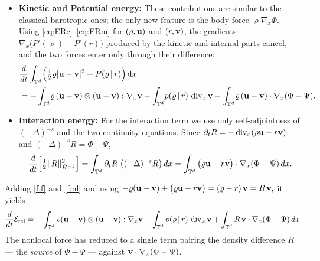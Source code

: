 \documentclass[12pt,a4paper,twoside]{article}
\newcommand{\vr}{\varrho}
\newcommand{\vu}{\vc{u}}
\newcommand{\vv}{\vc{v}}
\newcommand{\vc}[1]{{\bf #1}}
\newcommand{\dx}{{\,\rm d} {x}}
\newcommand{\Erel}{\mathcal{E}_{\mathrm{rel}}}
\numberwithin{equation}{section}%
\newcommand{\Gradx}{\nabla_x}
\newcommand{\Divx}{\operatorname{div}_x}
\begin{document}
\begin{itemize}[leftmargin=*]
	\item[-] \textbf{Kinetic and Potential energy:}
	These contributions are  similar to the classical barotropic ones; the only new feature is the body force $\vr\Gradx\Phi$. Using \eqref{eq:ERc}--\eqref{eq:ERm} for $(\vr,\vu)$ and $(r,\vv)$, the gradients $\Gradx\big(P'(\vr)-P'(r)\big)$ produced by the kinetic and internal parts cancel, and the two forces enter only through their difference:
	\begin{align}\label{f:f}
		&\frac{d}{dt}\int_{\mathbb T^d}\!\Big(\tfrac12\vr|\vu-\vv|^2+P(\vr\,|\,r)\Big) \dx
		\nonumber \\ 
		&=-\int_{\mathbb T^d}\!\vr\,(\vu-\vv)\otimes(\vu-\vv):\Gradx\vv
		-\int_{\mathbb T^d}\! p(\vr\,|\,r)\,\Divx\vv
		-\int_{\mathbb T^d}\!\vr\,(\vu-\vv)\cdot\Gradx(\Phi-\Psi).
	\end{align}
	\item[-] \textbf{Interaction energy:}
	For the interaction term we use only self-adjointness of $(-\Delta)^{-s}$ and the two continuity equations. Since $\partial_t R=-\Divx(\vr\vu-r\vv)$ and $(-\Delta)^{-s}R=\Phi-\Psi$,
	\begin{equation}\label{f:nl}
		\frac{d}{dt}\Big[\tfrac12\|R\|_{\dot H^{-s}}^2\Big]
		=\int_{\mathbb T^d}\partial_t R\;\big((-\Delta)^{-s}R\big)\,dx
		=\int_{\mathbb T^d}\big(\vr\vu-r\vv\big)\cdot\Gradx(\Phi-\Psi)\,dx .
	\end{equation}
\end{itemize}
Adding \eqref{f:f} and \eqref{f:nl} and using $ -\vr(\vu-\vv)+\big(\vr\vu-r\vv\big)=(\vr-r)\,\vv=R\,\vv ,$ it yields
\begin{equation}\label{mid}
	\frac{d}{dt}\Erel
	=-\int_{\mathbb T^d}\vr(\vu-\vv)\otimes(\vu-\vv):\Gradx\vv
	-\int_{\mathbb T^d} p(\vr\,|\,r)\,\Divx\vv
	+\int_{\mathbb T^d} R\,\vv\cdot\Gradx(\Phi-\Psi)\,dx .
\end{equation}
The nonlocal force has reduced to a single term pairing the density difference $R$ --- the \emph{source} of $\Phi-\Psi$ --- against $\vv\cdot\Gradx(\Phi-\Psi)$.
\end{document}
